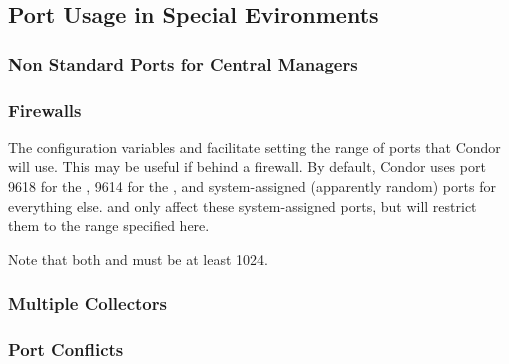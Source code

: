 \subsection{\label{sec:Port-Details}Port Usage in Special Evironments }

\Todo
{}

\subsubsection{\label{sec:Ports-NonStandard}Non Standard Ports for Central Managers}


\subsubsection{\label{sec:Ports-Firewalls}Firewalls}

The configuration variables
 and  facilitate setting the range
of ports that Condor will use.
This may be useful if behind a firewall.
By default,
Condor uses port 9618 for the ,
9614 for the ,
and system-assigned (apparently random) ports for everything else.
 and  only affect these
system-assigned ports, but will restrict them to the range specified here.

Note that both  and  must be at least 1024.


\subsubsection{\label{sec:Ports-MultipleCollectors}Multiple Collectors}


\subsubsection{\label{sec:Ports-Conflicts}Port Conflicts}

